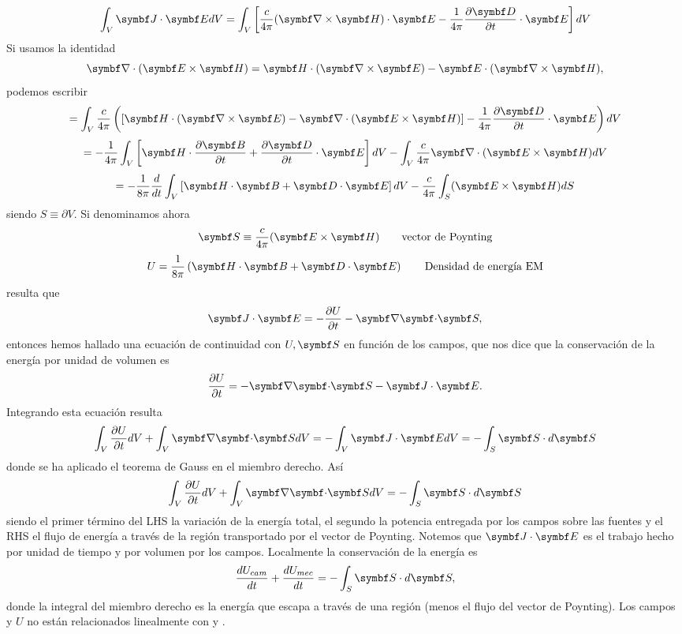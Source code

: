 \documentclass[10pt,oneside]{CBFT_book}
\begin{document}
\[
	\int_V \vb{J}\cdot \vb{E} dV = \int_V \left[ \frac{c}{4\pi}(\rotorm{H})\cdot\vb{E} - 
		\frac{1}{4\pi}\dpar{\vb{D}}{t}\cdot\vb{E} \right] dV
\]
Si usamos la identidad
\[
	\Nabla\cdot(\pv{E}{H}) = \vb{H}\cdot(\rotorm{E}) - \vb{E}\cdot(\rotorm{H}),
\]
podemos escribir
\[
	= \int_V \frac{c}{4\pi} \left( \left[ \vb{H}\cdot(\rotorm{E}) - \Nabla\cdot(\pv{E}{H}) \right] - 
		\frac{1}{4\pi}\dpar{\vb{D}}{t}\cdot\vb{E}  \right) dV
\]
\[
	= - \frac{1}{4\pi}\int_V \left[ \vb{H}\cdot\dpar{\vb{B}}{t} + \dpar{\vb{D}}{t}\cdot\vb{E} \right] dV - 
		\int_V \frac{c}{4\pi}  \Nabla\cdot(\pv{E}{H}) dV
\]
\[
	= - \frac{1}{8\pi}\frac{d}{dt} \int_V \left[ \vb{H}\cdot\vb{B} + \vb{D}\cdot\vb{E} \right] dV - 
		 \frac{c}{4\pi} \int_S (\pv{E}{H}) dS
\]
siendo $S\equiv\partial V$. Si denominamos ahora
\[
	\vb{S} \equiv \frac{c}{4\pi}(\pv{E}{H}) \qquad \text{vector de Poynting}
\]
\[
	U = \frac{1}{8\pi}\left( \vb{H}\cdot\vb{B} + \vb{D}\cdot\vb{E} \right) \qquad \text{Densidad de energía EM}
\]
resulta que 
\[
	\pe{J}{E} = -\dpar{U}{t} - \divem{S},
\]
entonces hemos hallado una ecuación de continuidad con $U, \vb{S}$ en función de los campos, que nos
dice que la conservación de la energía por unidad de volumen es
\[
	\dpar{U}{t} = -\divem{S} -\pe{J}{E}.
\]
Integrando esta ecuación resulta
\[
	\int_V \dpar{U}{t} dV + \int_V \divem{S} dV = - \int_V \pe{J}{E} dV = -\int_S \vb{S}\cdot d\vb{S}
\]
donde se ha aplicado el teorema de Gauss en el miembro derecho.
Así
\[
	\int_V \dpar{U}{t} dV + \int_V \divem{S} dV = -\int_S \vb{S}\cdot d\vb{S}
\]
siendo el primer término del LHS la variación de la energía total, el segundo la potencia entregada por
los campos sobre las fuentes y el RHS el flujo de energía a través de la región transportado por el
vector de Poynting.
Notemos que $\pe{J}{E}$ es el trabajo hecho por unidad de tiempo y por volumen por los campos.
Localmente la conservación de la energía es
\[
	\dtot{U_{cam}}{t} + \dtot{U_{mec}}{t} = -\int_S \vb{S}\cdot d\vb{S},
\]
donde la integral del miembro derecho es la energía que escapa a través de una región (menos el flujo
del vector de Poynting).
Los campos  y $U$ no están relacionados linealmente con  y .

\end{document}
